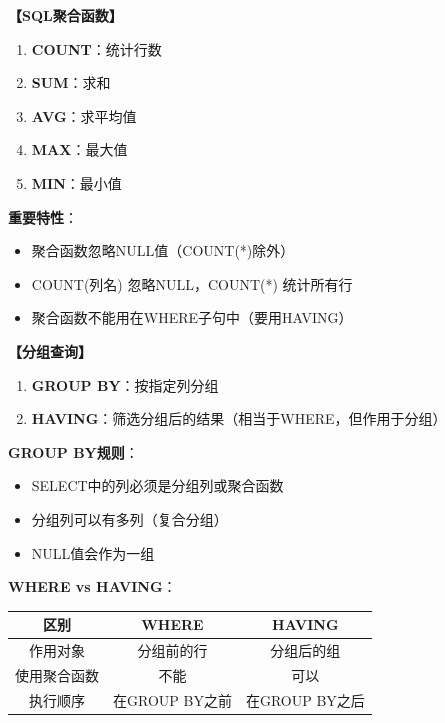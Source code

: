 \documentclass[12pt, a4paper]{article}
\newenvironment{bluebox}[1]{%
  \begin{trivlist}
  \item[\hskip\labelsep \textbf{#1}]
  \setlength{\parskip}{0.5ex}
  \setlength{\itemsep}{0.5ex}
}{%
  \end{trivlist}
}
\begin{document}
\begin{bluebox}{聚合函数}
	\textbf{【SQL聚合函数】}

	\begin{enumerate}[leftmargin=*, label=\textbf{\arabic*.}]
		\item \textbf{COUNT}：统计行数
		\item \textbf{SUM}：求和
		\item \textbf{AVG}：求平均值
		\item \textbf{MAX}：最大值
		\item \textbf{MIN}：最小值
	\end{enumerate}

	\textbf{重要特性}：
	\begin{itemize}
		\item 聚合函数忽略NULL值（COUNT(*)除外）
		\item COUNT(列名) 忽略NULL，COUNT(*) 统计所有行
		\item 聚合函数不能用在WHERE子句中（要用HAVING）
	\end{itemize}
\end{bluebox}

\begin{bluebox}{GROUP BY与HAVING}
	\textbf{【分组查询】}

	\begin{enumerate}[leftmargin=*, label=\textbf{\arabic*.}]
		\item \textbf{GROUP BY}：按指定列分组
		\item \textbf{HAVING}：筛选分组后的结果（相当于WHERE，但作用于分组）
	\end{enumerate}

	\textbf{GROUP BY规则}：
	\begin{itemize}
		\item SELECT中的列必须是分组列或聚合函数
		\item 分组列可以有多列（复合分组）
		\item NULL值会作为一组
	\end{itemize}

	\textbf{WHERE vs HAVING}：
	\begin{tabular}{|c|c|c|}
		\hline
		\textbf{区别} & \textbf{WHERE} & \textbf{HAVING} \\
		\hline
		作用对象        & 分组前的行          & 分组后的组           \\
		\hline
		使用聚合函数      & 不能             & 可以              \\
		\hline
		执行顺序        & 在GROUP BY之前    & 在GROUP BY之后     \\
		\hline
	\end{tabular}
\end{bluebox}
\end{document}
